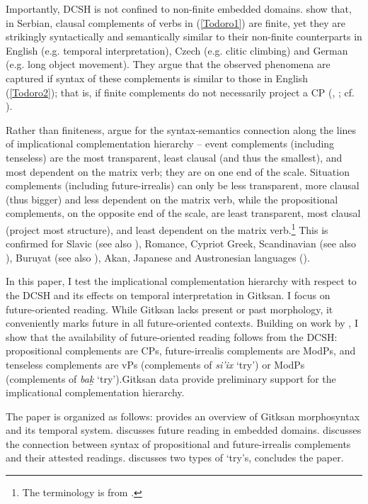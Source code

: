 \documentclass[output=paper]{langscibook}
\begin{document}
Importantly, DCSH is not confined to non-finite embedded domains. \citet{todoroviwurmbrand2020b} show that, in Serbian, clausal complements of verbs in (\ref{Todoro1}) are finite, yet they are strikingly syntactically and semantically similar to their non-finite counterparts in English (e.g. temporal interpretation), Czech (e.g. clitic climbing) and German (e.g. long object movement). They argue that the observed phenomena are captured if syntax of these complements is similar to those in English (\ref{Todoro2}); that is, if finite complements do not necessarily project a CP (\citealt{adger2007a}, \citealt{kornfilt2007a}; cf.  \citealt{rizzi1997a}).

Rather than finiteness, \citealt{wurmbrand2019a} argue for the syntax-semantics connection along the lines of implicational complementation hierarchy -- event complements (including tenseless) are the most transparent, least clausal (and thus the smallest), and most dependent on the matrix verb; they are on one end of the scale.  Situation complements (including future-irrealis) can only be less transparent, more clausal (thus bigger) and less dependent on the matrix verb, while the propositional complements, on the opposite end of the scale, are least transparent, most clausal (project most structure), and least dependent on the matrix verb.\footnote{The terminology is from \citet{ramchandsvenonius2014a}.} This is confirmed for Slavic (see also \citealt{wurmbrandetal2020}), Romance, Cypriot Greek, Scandinavian (see also \citealt{wurmbradnchristos2020}), Buruyat (see also \citealt{bondarenko2018a}), Akan, Japanese and Austronesian languages (\citealt{wurmbrand2017a}). 

In this paper, I test the implicational complementation hierarchy with respect to the DCSH and its effects on temporal interpretation in Gitksan. I focus on future-oriented reading. While Gitksan lacks present or past morphology, it conveniently marks future in all future-oriented contexts. Building on work by \citet{matthewson2018a}, I show that the availability of future-oriented reading follows from the DCSH: propositional complements are CPs, future-irrealis complements are ModPs, and tenseless complements are vPs (complements of \emph{si’ix} ‘try’) or ModPs (complements of \emph{bak̲} ‘try’).Gitksan data provide preliminary support for the implicational complementation hierarchy.

The paper is organized as follows:  provides an overview of Gitksan morphosyntax and its temporal system.  discusses future reading in embedded domains.  discusses the connection between syntax of propositional and future-irrealis complements and their attested readings.  discusses two types of ‘try’s,  concludes the paper. 
\end{document}
